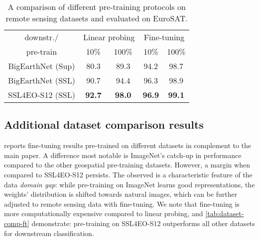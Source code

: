 \documentclass[lettersize,journal]{IEEEtran}
\begin{document}
\begin{table}[h!]
\centering
\caption{A comparison of different pre-training protocols on remote sensing datasets and evaluated on EuroSAT.}
\label{tab:rs-sup}
\begin{tabular}{ccccc}
\hline
downstr./                 & \multicolumn{2}{c}{Linear probing} & \multicolumn{2}{c}{Fine-tuning} \\
pre-train                   & 10\%     & 100\%   & 10\%   & 100\%  \\ \hline \hline
BigEarthNet (Sup) & 80.3             & 89.3            & 94.2           & 98.7           \\
BigEarthNet (SSL) & 90.7             & 94.4            & 96.3           & 98.9           \\
SSL4EO-S12 (SSL)  & \textbf{92.7}    & \textbf{98.0}   & \textbf{96.9}  & \textbf{99.1}  \\ \hline
\end{tabular}
\end{table}




\subsection{\textbf{Additional dataset comparison results}}

 reports fine-tuning results pre-trained on different datasets in complement to the main paper. A difference most notable is ImageNet's catch-up in performance compared to the other geospatial pre-training datasets. However, a  margin when compared to SSL4EO-S12 persists. The observed is a characteristic feature of the data \textit{domain gap}: while pre-training on ImageNet learns good representations, the weights' distribution is shifted towards natural images, which can be further adjusted to remote sensing data with fine-tuning. We note that fine-tuning is more computationally expensive compared to linear probing, and \cref{tab:dataset-comp-ft} demonstrate: pre-training on SSL4EO-S12 outperforms all other datasets for downstream classification.
\end{document}
